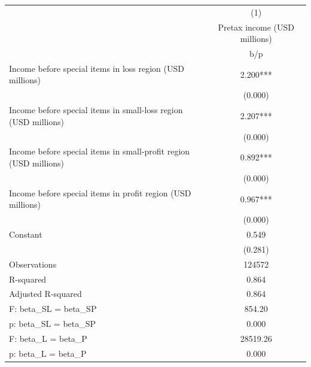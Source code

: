 {
\def\sym#1{\ifmmode^{#1}\else\(^{#1}\)\fi}
\begin{tabular}{l*{1}{c}}
\hline\hline
                    &\multicolumn{1}{c}{(1)}\\
                    &\multicolumn{1}{c}{Pretax income (USD millions)}\\
                    &         b/p   \\
\hline
Income before special items in loss region (USD millions)&       2.200***\\
                    &     (0.000)   \\
Income before special items in small-loss region (USD millions)&       2.207***\\
                    &     (0.000)   \\
Income before special items in small-profit region (USD millions)&       0.892***\\
                    &     (0.000)   \\
Income before special items in profit region (USD millions)&       0.967***\\
                    &     (0.000)   \\
Constant            &       0.549   \\
                    &     (0.281)   \\
\hline
Observations        &      124572   \\
R-squared           &       0.864   \\
Adjusted R-squared  &       0.864   \\
F: beta\_SL = beta\_SP&      854.20   \\
p: beta\_SL = beta\_SP&       0.000   \\
F: beta\_L = beta\_P  &    28519.26   \\
p: beta\_L = beta\_P  &       0.000   \\
\hline\hline
\end{tabular}
}
